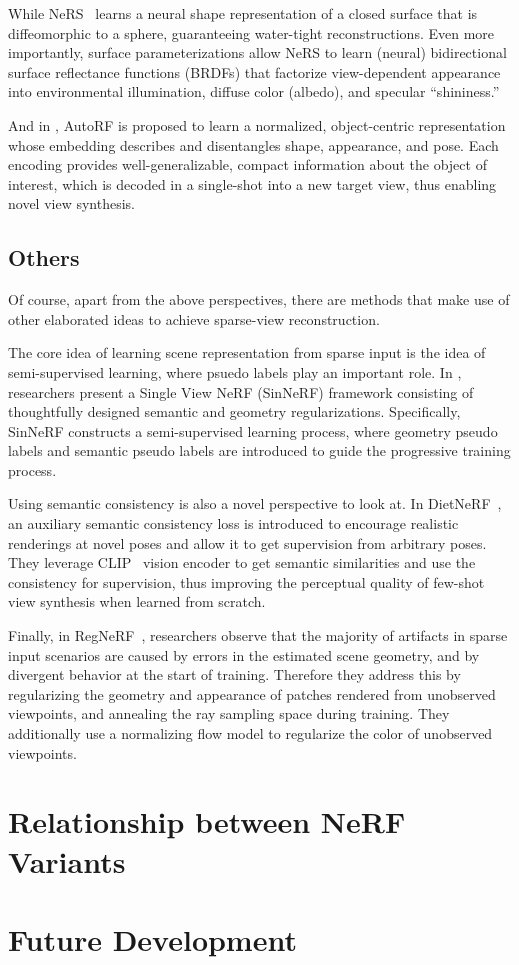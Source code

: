 \documentclass[10pt,twocolumn,letterpaper]{article}
\begin{document}
While NeRS~\cite{zhang2021ners} learns a neural shape representation of a closed surface that is diffeomorphic to a sphere, guaranteeing water-tight reconstructions. Even more importantly, surface parameterizations allow NeRS to learn (neural) bidirectional surface reﬂectance functions (BRDFs) that factorize view-dependent appearance into environmental illumination, diffuse color (albedo), and specular “shininess.”

And in \cite{mueller2022autorf}, AutoRF is proposed to learn a normalized, object-centric representation whose embedding describes and disentangles shape, appearance, and pose. Each encoding provides well-generalizable, compact information about the object of interest, which is decoded in a single-shot into a new target view, thus enabling novel view synthesis.

\subsection{Others}

Of course, apart from the above perspectives, there are methods that make use of other elaborated ideas to achieve sparse-view reconstruction.

The core idea of learning scene representation from sparse input is the idea of semi-supervised learning, where psuedo labels play an important role. 
In \cite{Xu_2022_SinNeRF}, researchers present a Single View NeRF (SinNeRF) framework consisting of thoughtfully designed semantic and geometry regularizations.
Specifically, SinNeRF constructs a semi-supervised learning process, where geometry pseudo labels and semantic pseudo labels are introduced to guide the progressive training process.

Using semantic consistency is also a novel perspective to look at. In DietNeRF~\cite{Jain_2021_ICCV}, an auxiliary semantic consistency loss is introduced to encourage realistic renderings at novel poses and allow it to get supervision from arbitrary poses. They leverage CLIP~\cite{DBLP:journals/corr/abs-2103-00020} vision encoder to get semantic similarities and use the consistency for supervision, thus improving the perceptual quality of few-shot view synthesis when learned from scratch.

Finally, in RegNeRF~\cite{Niemeyer2021Regnerf}, researchers observe that the majority of artifacts in sparse input scenarios are caused by errors in the estimated scene geometry, and by divergent behavior at the start of training. Therefore they address this by regularizing the geometry and appearance of patches rendered from unobserved viewpoints, and annealing the ray sampling space during training. They additionally use a normalizing flow model to regularize the color of unobserved viewpoints.

\section{Relationship between NeRF Variants}

\section{Future Development}

\newpage
{\small


}
\end{document}
